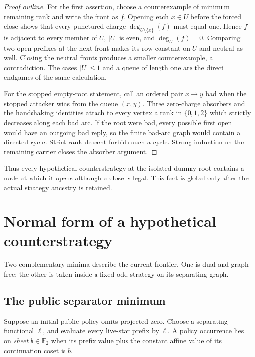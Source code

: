 \documentclass[11pt]{article}
\theoremstyle{definition}
\theoremstyle{remark}
\begin{document}
\begin{proof}[Proof outline]
For the first assertion, choose a counterexample of minimum remaining rank
and write the front as $f$.  Opening each $x\in U$ before the forced close
shows that every punctured charge
$\deg_{U\setminus\{x\}}(f)$ must equal one.  Hence $f$ is adjacent to every
member of $U$, $|U|$ is even, and $\deg_U(f)=0$.  Comparing two-open
prefixes at the next front makes its row constant on $U$ and neutral as
well.  Closing the neutral fronts produces a smaller counterexample, a
contradiction.  The cases $|U|\le1$ and a queue of length one are the direct
endgames of the same calculation.

For the stopped empty-root statement, call an ordered pair $x\to y$ bad when
the stopped attacker wins from the queue $(x,y)$.  Three zero-charge
absorbers and the handshaking identities attach to every vertex a rank in
$\{0,1,2\}$ which strictly decreases along each bad arc.  If the root were
bad, every possible first open would have an outgoing bad reply, so the
finite bad-arc graph would contain a directed cycle.  Strict rank descent
forbids such a cycle.  Strong induction on the remaining carrier closes the
absorber argument.
\end{proof}

Thus every hypothetical counterstrategy at the isolated-dummy root contains
a node at which it opens although a close is legal.  This fact is global
only after the actual strategy ancestry is retained.

\section{Normal form of a hypothetical counterstrategy}\label{sec:normal}

Two complementary minima describe the current frontier.  One is dual and
graph-free; the other is taken inside a fixed odd strategy on its separating
graph.

\subsection{The public separator minimum}

Suppose an initial public policy omits projected zero.  Choose a separating
functional $\ell$, and evaluate every live-star prefix by $\ell$.  A policy
occurrence lies on \emph{sheet} $b\in\mathbb F_2$ when its prefix value plus
the constant affine value of its continuation coset is $b$.
\end{document}
